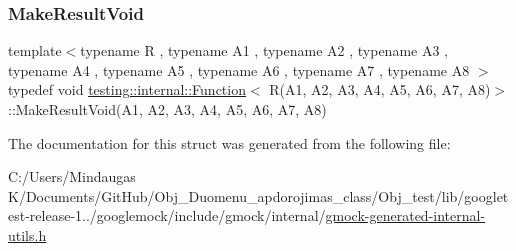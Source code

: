 \subsubsection{\texorpdfstring{MakeResultVoid}{MakeResultVoid}}
{\footnotesize\ttfamily template$<$typename R , typename A1 , typename A2 , typename A3 , typename A4 , typename A5 , typename A6 , typename A7 , typename A8 $>$ \\
typedef void \mbox{\hyperlink{structtesting_1_1internal_1_1_function}{testing\+::internal\+::\+Function}}$<$ R(A1, A2, A3, A4, A5, A6, A7, A8)$>$\+::Make\+Result\+Void(A1, A2, A3, A4, A5, A6, A7, A8)}



The documentation for this struct was generated from the following file\+:\begin{DoxyCompactItemize}
\item 
C\+:/\+Users/\+Mindaugas K/\+Documents/\+Git\+Hub/\+Obj\+\_\+\+Duomenu\+\_\+apdorojimas\+\_\+class/\+Obj\+\_\+test/lib/googletest-\/release-\/1../googlemock/include/gmock/internal/\mbox{\hyperlink{gmock-generated-internal-utils_8h}{gmock-\/generated-\/internal-\/utils.\+h}}\end{DoxyCompactItemize}
